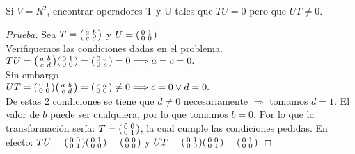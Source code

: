 \documentclass[12pt]{article}
\newenvironment{problem}[2][Problem]{\begin{trivlist}
\item[\hskip \labelsep {\bfseries #1}\hskip \labelsep {\bfseries #2.}]}{\end{trivlist}}
\newenvironment{xmat}
  {\left(\begin{smallmatrix}}
  {\end{smallmatrix}\right)}
\begin{document}
\begin{problem}{2.2}
Si $V= R^{2}$, encontrar operadores T y U tales que $TU=0$ pero que $UT \neq 0$.
\end{problem}

\begin{proof}[Prueba]
Sea $T=\begin{xmat}a & b\\c & d\end{xmat}$ y $U=\begin{xmat}0 & 1\\0 & 0\end{xmat}$\\
Verifiquemos las condiciones dadas en el problema.\\

$TU=\begin{xmat}a & b\\c & d\end{xmat}\begin{xmat}0 & 1\\0 & 0\end{xmat} = 
	\begin{xmat}0 & a\\0 & c\end{xmat}=0 \Longrightarrow a=c=0.$ \\
Sin embargo \\
$UT= \begin{xmat}0 & 1\\0 & 0\end{xmat}\begin{xmat}a & b\\c & d\end{xmat} = 
	\begin{xmat}c & d\\0 & 0\end{xmat}\neq 0 \Longrightarrow c=0 \lor d=0.$ \\
De estas 2 condiciones se tiene que $d \neq 0$ necesariamente $\Longrightarrow$ tomamos $d=1$. El valor de $b$ puede ser cualquiera, por lo que tomamos $b=0$. Por lo que la transformación sería: $T=\begin{xmat}0 & 0\\0 & 1\end{xmat}$, la cual cumple las condiciones pedidas. En efecto: 
$TU=\begin{xmat}0 & 0\\0 & 1\end{xmat}\begin{xmat}0 & 1\\0 & 0\end{xmat}=
	\begin{xmat}0 & 0\\0 & 0\end{xmat}$ y $UT=\begin{xmat}0 & 1\\0 & 0\end{xmat}\begin{xmat}0 & 0\\0 & 1\end{xmat}=
	\begin{xmat}0 & 1\\0 & 0\end{xmat}$
\end{proof}
\end{document}
